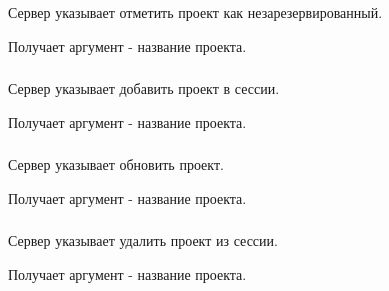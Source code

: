 Сервер указывает отметить проект как незарезервированный.

Получает аргумент  - название проекта.

\subsubsection{}

Сервер указывает добавить проект в сессии.

Получает аргумент  - название проекта.

\subsubsection{}

Сервер указывает обновить проект.

Получает аргумент  - название проекта.

\subsubsection{}

Сервер указывает удалить проект из сессии.

Получает аргумент  - название проекта.

